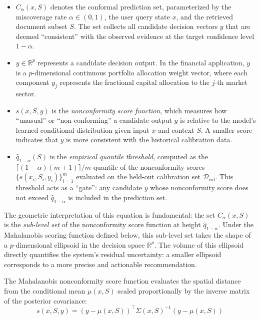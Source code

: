 \documentclass[12pt,a4paper,oneside]{report}
\theoremstyle{definition}
\theoremstyle{remark}
\begin{document}
\begin{itemize}[leftmargin=2em]
  \item $C_{\alpha}(x, S)$ denotes the conformal prediction set, parameterized by the miscoverage rate $\alpha \in (0,1)$, the user query state $x$, and the retrieved document subset $S$. The set collects all candidate decision vectors $y$ that are deemed ``consistent'' with the observed evidence at the target confidence level $1 - \alpha$.
  \item $y \in \mathbb{R}^p$ represents a candidate decision output. In the financial application, $y$ is a $p$-dimensional continuous portfolio allocation weight vector, where each component $y_j$ represents the fractional capital allocation to the $j$-th market sector.
  \item $s(x, S, y)$ is the \emph{nonconformity score function}, which measures how ``unusual'' or ``non-conforming'' a candidate output $y$ is relative to the model's learned conditional distribution given input $x$ and context $S$. A smaller score indicates that $y$ is more consistent with the historical calibration data.
  \item $\hat{q}_{1-\alpha}(S)$ is the \emph{empirical quantile threshold}, computed as the $\lceil(1-\alpha)(m+1)\rceil / m$ quantile of the nonconformity scores $\{s(x_i, S_i, y_i)\}_{i=1}^m$ evaluated on the held-out calibration set $\mathcal{D}_{\text{cal}}$. This threshold acts as a ``gate'': any candidate $y$ whose nonconformity score does not exceed $\hat{q}_{1-\alpha}$ is included in the prediction set.
\end{itemize}

\noindent The geometric interpretation of this equation is fundamental: the set $C_{\alpha}(x, S)$ is the \emph{sub-level set} of the nonconformity score function at height $\hat{q}_{1-\alpha}$. Under the Mahalanobis scoring function defined below, this sub-level set takes the shape of a $p$-dimensional ellipsoid in the decision space $\mathbb{R}^p$. The volume of this ellipsoid directly quantifies the system's residual uncertainty: a smaller ellipsoid corresponds to a more precise and actionable recommendation.

\medskip
\noindent The Mahalanobis nonconformity score function evaluates the spatial distance from the conditional mean $\mu(x,S)$ scaled proportionally by the inverse matrix of the posterior covariance:
\begin{equation} \label{eq:mahalanobis_score}
s(x, S, y) = (y - \mu(x,S))^\top \Sigma(x, S)^{-1} (y - \mu(x,S))
\end{equation}
\end{document}
